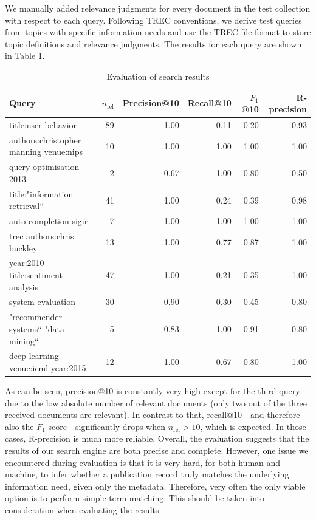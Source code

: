 \documentclass{sig-alternate-05-2015}
\begin{document}
We manually added relevance judgments for every document in the test collection with respect to each query. Following TREC conventions, we derive test queries from topics with specific information needs and use the TREC file format to store topic definitions and relevance judgments. The results for each query are shown in Table \ref{tbl:evalsearch}.

\begin{table}[th]
\centering
\caption{Evaluation of search results} \label{tbl:evalsearch}
\begin{tabular}{lrrrrr}
Query & $n_\text{rel}$ & Precision@10 & Recall@10 & $F_1$@10 & R-precision \\
\hline
title:user behavior & 89 & 1.00 & 0.11 & 0.20 & 0.93 \\
authors:christopher manning venue:nips & 10 & 1.00 & 1.00 & 1.00 & 1.00 \\
query optimisation 2013 & 2 & 0.67 & 1.00 & 0.80 & 0.50 \\
title:"information retrieval`` & 41 & 1.00 & 0.24 & 0.39 & 0.98 \\
auto-completion sigir & 7 & 1.00 & 1.00 & 1.00 & 1.00 \\
trec authors:chris buckley & 13 & 1.00 & 0.77 & 0.87 & 1.00 \\
year:2010 title:sentiment analysis & 47 & 1.00 & 0.21 & 0.35 & 1.00 \\
system evaluation & 30 & 0.90 & 0.30 & 0.45 & 0.80 \\
"recommender systems`` "data mining`` & 5 & 0.83 & 1.00 & 0.91 & 0.80 \\
deep learning venue:icml year:2015 & 12 & 1.00 & 0.67 & 0.80 & 1.00 \\
\end{tabular}
\end{table}

As can be seen, precision@10 is constantly very high except for the third query due to the low absolute number of relevant documents (only two out of the three received documents are relevant). In contrast to that, recall@10---and therefore also the $F_1$ score---significantly drops when $n_\text{rel} > 10$, which is expected. In those cases, R-precision is much more reliable. Overall, the evaluation suggests that the results of our search engine are both precise and complete. However, one issue we encountered during evaluation is that it is very hard, for both human and machine, to infer whether a publication record truly matches the underlying information need, given only the metadata. Therefore, very often the only viable option is to perform simple term matching. This should be taken into consideration when evaluating the results.
\end{document}
